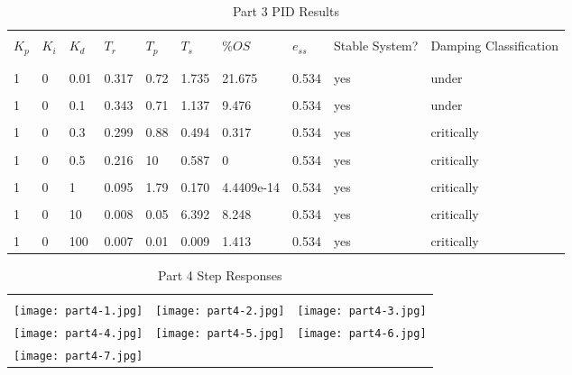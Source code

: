 \begin{table}[H]
	\begin{tabularx}{\textwidth}{XXXXXXXXXX}
		\toprule
		\\ $K_p$ & $K_i$ & $K_d$ & $T_r$ & $T_p$ & $T_s$ & $\%OS$ & $e_{ss}$ 
		& Stable System? & Damping Classification
		\\ \midrule
		
\\\midrule\\1&0&0.01&0.317&0.72&1.735&21.675&0.534&yes&under 
\\\midrule\\1&0&0.1&0.343&0.71&1.137&9.476&0.534&yes&under 
\\\midrule\\1&0&0.3&0.299&0.88&0.494&0.317&0.534&yes&critically 
\\\midrule\\1&0&0.5&0.216&10&0.587&0&0.534&yes&critically 
\\\midrule\\1&0&1&0.095&1.79&0.170&4.4409e-14&0.534&yes&critically 
\\\midrule\\1&0&10&0.008&0.05&6.392&8.248&0.534&yes&critically 
\\\midrule\\1&0&100&0.007&0.01&0.009&1.413&0.534&yes&critically 
		\\ \bottomrule
	\end{tabularx}
	\caption{Part 3 PID Results}
	\label{tab:pid3SimResults}
\end{table}
\begin{table}[H]
\begin{tabular}{ccc}
\toprule
\\ \texttt{[image: part4-1.jpg]} 
& \texttt{[image: part4-2.jpg]} 
& \texttt{[image: part4-3.jpg]} 
\\ \texttt{[image: part4-4.jpg]} 
& \texttt{[image: part4-5.jpg]} 
& \texttt{[image: part4-6.jpg]} 
\\ \texttt{[image: part4-7.jpg]} 
\\ \bottomrule
\end{tabular}
\caption{Part 4 Step Responses}
\end{table}
